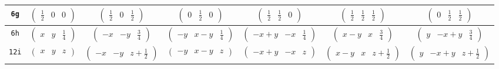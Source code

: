 \documentclass[fleqn,9pt,landscape]{jsarticle}
\begin{document}
\begin{center}
\begin{longtable}{ccccccc}
{\tt 6g} & $ \begin{pmatrix} \frac{1}{2} & 0 & 0 \end{pmatrix} $ & $ \begin{pmatrix} \frac{1}{2} & 0 & \frac{1}{2} \end{pmatrix} $ & $ \begin{pmatrix} 0 & \frac{1}{2} & 0 \end{pmatrix} $ & $ \begin{pmatrix} \frac{1}{2} & \frac{1}{2} & 0 \end{pmatrix} $ & $ \begin{pmatrix} \frac{1}{2} & \frac{1}{2} & \frac{1}{2} \end{pmatrix} $ & $ \begin{pmatrix} 0 & \frac{1}{2} & \frac{1}{2} \end{pmatrix} $ \\ \hline
{\tt 6h} & $ \begin{pmatrix} x & y & \frac{1}{4} \end{pmatrix} $ & $ \begin{pmatrix} - x & - y & \frac{3}{4} \end{pmatrix} $ & $ \begin{pmatrix} - y & x - y & \frac{1}{4} \end{pmatrix} $ & $ \begin{pmatrix} - x + y & - x & \frac{1}{4} \end{pmatrix} $ & $ \begin{pmatrix} x - y & x & \frac{3}{4} \end{pmatrix} $ & $ \begin{pmatrix} y & - x + y & \frac{3}{4} \end{pmatrix} $ \\ \hline
{\tt 12i} & $ \begin{pmatrix} x & y & z \end{pmatrix} $ & $ \begin{pmatrix} - x & - y & z + \frac{1}{2} \end{pmatrix} $ & $ \begin{pmatrix} - y & x - y & z \end{pmatrix} $ & $ \begin{pmatrix} - x + y & - x & z \end{pmatrix} $ & $ \begin{pmatrix} x - y & x & z + \frac{1}{2} \end{pmatrix} $ & $ \begin{pmatrix} y & - x + y & z + \frac{1}{2} \end{pmatrix} $ \\

\end{longtable}
\end{center}
\end{document}
